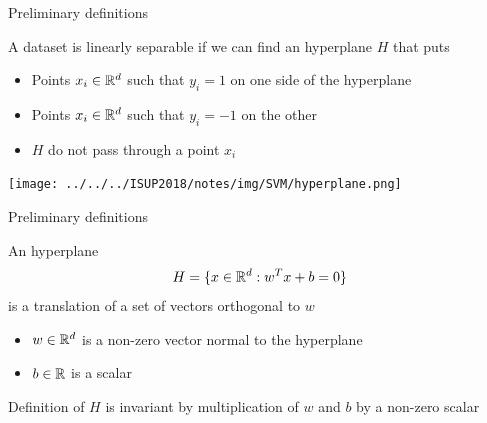 \documentclass[xcolor={usenames,dvipsnames}]{beamer}
\begin{document}



  \begin{frame}{Preliminary definitions}
  
  \begin{exampleblock}{}
A dataset is {\color{Vert} linearly separable} if we can find an hyperplane $H$ that puts 
\begin{itemize}
  \item Points $x_i \in \mathbb{R}^d$ such that $y_i = 1$ on one side of the hyperplane
  \item Points $x_i \in \mathbb{R}^d$ such that $y_i = -1$ on the other
  \item $H$ do not pass through a point $x_i$
\end{itemize}
\end{exampleblock}

\begin{center}
  \texttt{[image: ../../../ISUP2018/notes/img/SVM/hyperplane.png]}
\end{center}
\end{frame}



\begin{frame}{Preliminary definitions}
\begin{exampleblock}{}
  An {\color{Vert}hyperplane }
  \begin{equation*}
      H = \{ x \in \mathbb{R}^d : w^T x + b = 0 \}
  \end{equation*}
  is a translation of a set of vectors orthogonal to $w$
  \begin{itemize}
    \item $w \in \mathbb{R}^d$ is a non-zero vector normal to the hyperplane
    \item $b \in \mathbb{R}$ is a scalar 
  \end{itemize}
 \end{exampleblock}
  
  
    Definition of $H$ is invariant by multiplication of $w$ and $b$ by a non-zero scalar
\end{frame}
\end{document}
